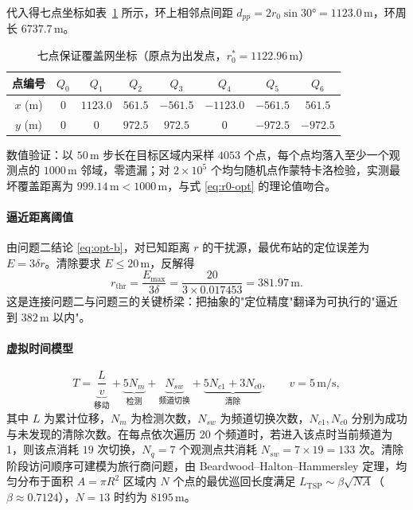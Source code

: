 \documentclass[12pt,a4paper]{ctexart}
\begin{document}
代入得七点坐标如表~\ref{tab:q3-net} 所示，环上相邻点间距 $d_{pp}=2r_0\sin30°=1123.0\,\text{m}$，环周长 $6737.7\,\text{m}$。

\begin{table}[H]
  \centering
  \caption{七点保证覆盖网坐标（原点为出发点，$r_0^{*}=1122.96\,\text{m}$）}
  \label{tab:q3-net}
  \small
  \begin{tabular}{cccccccc}
    \toprule
    点编号 & $Q_0$ & $Q_1$ & $Q_2$ & $Q_3$ & $Q_4$ & $Q_5$ & $Q_6$ \\
    \midrule
    $x$ (m) & $0$ & $1123.0$ & $561.5$ & $-561.5$ & $-1123.0$ & $-561.5$ & $561.5$ \\
    $y$ (m) & $0$ & $0$ & $972.5$ & $972.5$ & $0$ & $-972.5$ & $-972.5$ \\
    \bottomrule
  \end{tabular}
\end{table}

数值验证：以 $50\,\text{m}$ 步长在目标区域内采样 $4053$ 个点，每个点均落入至少一个观测点的 $1000\,\text{m}$ 邻域，零遗漏；对 $2\times10^5$ 个均匀随机点作蒙特卡洛检验，实测最坏覆盖距离为 $999.14\,\text{m}<1000\,\text{m}$，与式 \eqref{eq:r0-opt} 的理论值吻合。

\paragraph{逼近距离阈值}
由问题二结论 \eqref{eq:opt-b}，对已知距离 $r$ 的干扰源，最优布站的定位误差为 $E=3\delta r$。清除要求 $E\le20\,\text{m}$，反解得
\begin{equation}
  r_{\mathrm{thr}}=\frac{E_{\max}}{3\delta}=\frac{20}{3\times0.017453}=381.97\,\text{m}.
  \label{eq:threshold}
\end{equation}
这是连接问题二与问题三的关键桥梁：把抽象的"定位精度"翻译为可执行的"逼近到 $382\,\text{m}$ 以内"。

\paragraph{虚拟时间模型}
\begin{equation}
  T=\underbrace{\frac{L}{v}}_{\text{移动}}+\underbrace{5N_m}_{\text{检测}}
  +\underbrace{N_{sw}}_{\text{频道切换}}
  +\underbrace{5N_{c1}+3N_{c0}}_{\text{清除}},\qquad v=5\,\text{m/s},
  \label{eq:time-model}
\end{equation}
其中 $L$ 为累计位移，$N_m$ 为检测次数，$N_{sw}$ 为频道切换次数，$N_{c1},N_{c0}$ 分别为成功与未发现的清除次数。在每点依次遍历 20 个频道时，若进入该点时当前频道为 1，则该点消耗 $19$ 次切换，$N_q=7$ 个观测点共消耗 $N_{sw}=7\times19=133$ 次。清除阶段访问顺序可建模为旅行商问题，由 Beardwood--Halton--Hammersley 定理，均匀分布于面积 $A=\pi R^2$ 区域内 $N$ 个点的最优巡回长度满足 $L_{\mathrm{TSP}}\sim\beta\sqrt{NA}$（$\beta\approx0.7124$），$N=13$ 时约为 $8195\,\text{m}$。
\end{document}
